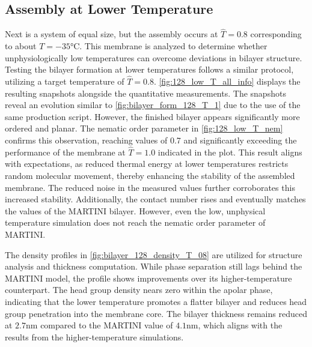 \documentclass[
    11pt,
    a4paper,
    oneside,        %
    BCOR=10mm,      %
    parskip=half,   %
    listof=nototoc,   %
    bibliography=totoc %
]{scrreprt}
\begin{document}
\subsection*{Assembly at Lower Temperature}

\enlargethispage{\baselineskip}
Next is a system of equal size, but the assembly occurs at $\hat{T} = 0.8$ corresponding to about $T = -35\si{\celsius}$. This membrane is analyzed to determine whether unphysiologically low temperatures can overcome deviations in bilayer structure. Testing the bilayer formation at lower temperatures follows a similar protocol, utilizing a target temperature of $\hat{T}=0.8$. \cref{fig:128_low_T_all_info} displays the resulting snapshots alongside the quantitative measurements. The snapshots reveal an evolution similar to \cref{fig:bilayer_form_128_T_1} due to the use of the same production script. However, the finished bilayer appears significantly more ordered and planar. The nematic order parameter in \cref{fig:128_low_T_nem} confirms this observation, reaching values of 0.7 and significantly exceeding the performance of the membrane at $\hat{T} = 1.0$ indicated in the plot. This result aligns with expectations, as reduced thermal energy at lower temperatures restricts random molecular movement, thereby enhancing the stability of the assembled membrane. The reduced noise in the measured values further corroborates this increased stability. Additionally, the contact number rises and eventually matches the values of the MARTINI bilayer. However, even the low, unphysical temperature simulation does not reach the nematic order parameter of MARTINI.


The density profiles in \cref{fig:bilayer_128_density_T_08} are utilized for structure analysis and thickness computation. While phase separation still lags behind the MARTINI model, the profile shows improvements over its higher-temperature counterpart. The head group density nears zero within the apolar phase, indicating that the lower temperature promotes a flatter bilayer and reduces head group penetration into the membrane core. The bilayer thickness remains reduced at $2.7\si{\nano\m}$ compared to the MARTINI value of $4.1\si{\nano\m}$, which aligns with the results from the higher-temperature simulations.
\end{document}
